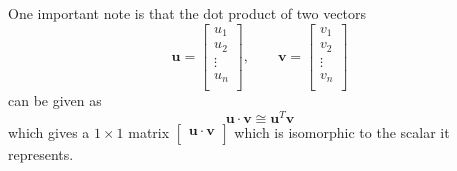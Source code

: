 One important note is that the dot product of two vectors
\[
    \mathbf{u} =\begin{bmatrix}
         u_1 \\
          u_2\\
          \vdots\\
          u_n\\
    \end{bmatrix},\qquad \mathbf{v} =\begin{bmatrix}
         v_1 \\
          v_2\\
          \vdots\\
          v_n\\
    \end{bmatrix}
\]
can be given as 
\[
    \mathbf{u} \cdot \mathbf{v} \cong \mathbf{u}^T \mathbf{v}
\]
which gives a \(1\times 1\) matrix \(\begin{bmatrix}
     \mathbf{u} \cdot \mathbf{v}  \\
\end{bmatrix}\)  which is isomorphic to the scalar it represents.
